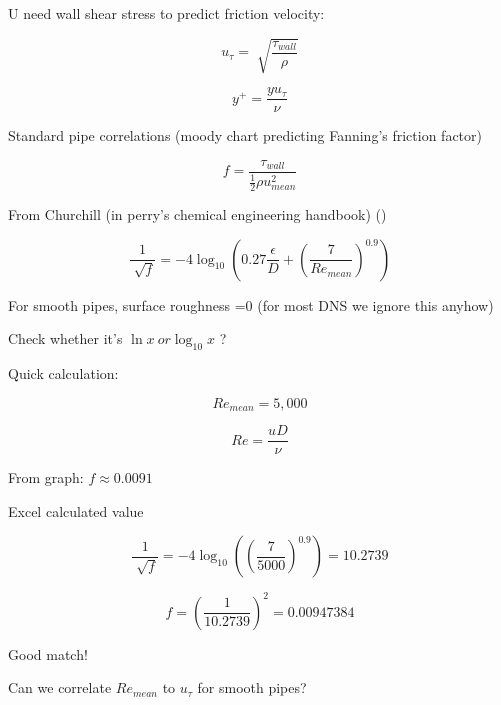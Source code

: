 \documentclass[12pt]{article}
\renewcommand{\_}{\kern-1.5pt\textunderscore\kern-1.5pt}
\begin{document}
\vspace{\baselineskip}
U need wall shear stress to predict friction velocity:\par

 \[ u_{ \tau}=\sqrt[]{\frac{ \tau_{wall}}{ \rho }} \] \par

 \[ y^{+}=\frac{yu_{ \tau}}{ \nu } \] \par

Standard pipe correlations (moody chart predicting Fanning’s friction factor)\par

 \[ f=\frac{ \tau_{wall}}{\frac{1}{2} \rho u_{mean}^{2}} \] \par

From Churchill (in perry’s chemical engineering handbook) (\cite{Perry2015})\par

 \[ \frac{1}{\sqrt[]{f}}=-4\log _{10} \left( 0.27\frac{ \epsilon }{D}+ \left( \frac{7}{Re_{mean}} \right) ^{0.9} \right)  \] \par

For smooth pipes, surface roughness =0 (for most DNS we ignore this anyhow)\par

Check whether it’s  \( \ln x~or\log _{10}x \) ?\par

Quick calculation:\par

 \[ Re_{mean}=5,000 \] \par

 \[ Re=\frac{uD}{ \nu } \] \par

From graph:  \( f \approx 0.0091 \) \par

Excel calculated value\par

 \[ \frac{1}{\sqrt[]{f}}=-4\log _{10} \left(  \left( \frac{7}{5000} \right) ^{0.9} \right) =10.2739 \] \par

 \[ f= \left( \frac{1}{10.2739} \right) ^{2}=0.00947384 \] \par


\vspace{\baselineskip}
Good match!\par

Can we correlate  \( Re_{mean} \)  to  \( u_{ \tau} \)  for smooth pipes?\par
\end{document}
